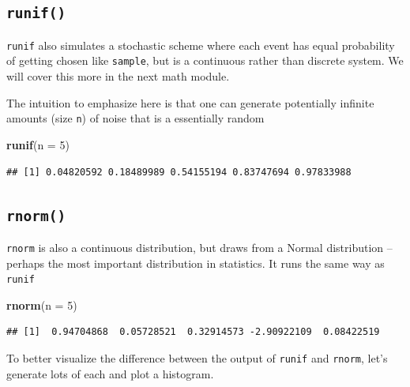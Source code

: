 \documentclass[]{book}
\newenvironment{Shaded}{\begin{snugshade}}{\end{snugshade}}
\newcommand{\DataTypeTok}[1]{\textcolor[rgb]{0.13,0.29,0.53}{#1}}
\newcommand{\DecValTok}[1]{\textcolor[rgb]{0.00,0.00,0.81}{#1}}
\newcommand{\KeywordTok}[1]{\textcolor[rgb]{0.13,0.29,0.53}{\textbf{#1}}}
\newcommand{\NormalTok}[1]{#1}
\theoremstyle{definition}
\theoremstyle{definition}
\theoremstyle{definition}
\theoremstyle{remark}
\begin{document}
\hypertarget{runif}{%
\subsection*{\texorpdfstring{\texttt{runif()}}{runif()}}\label{runif}}

\texttt{runif} also simulates a stochastic scheme where each event has equal probability of getting chosen like \texttt{sample}, but is a continuous rather than discrete system. We will cover this more in the next math module.

The intuition to emphasize here is that one can generate potentially infinite amounts (size \texttt{n}) of noise that is a essentially random

\begin{Shaded}
\begin{Highlighting}[]
\KeywordTok{runif}\NormalTok{(}\DataTypeTok{n =} \DecValTok{5}\NormalTok{)}
\end{Highlighting}
\end{Shaded}

\begin{verbatim}
## [1] 0.04820592 0.18489989 0.54155194 0.83747694 0.97833988
\end{verbatim}

\hypertarget{rnorm}{%
\subsection*{\texorpdfstring{\texttt{rnorm()}}{rnorm()}}\label{rnorm}}

\texttt{rnorm} is also a continuous distribution, but draws from a Normal distribution -- perhaps the most important distribution in statistics. It runs the same way as \texttt{runif}

\begin{Shaded}
\begin{Highlighting}[]
\KeywordTok{rnorm}\NormalTok{(}\DataTypeTok{n =} \DecValTok{5}\NormalTok{)}
\end{Highlighting}
\end{Shaded}

\begin{verbatim}
## [1]  0.94704868  0.05728521  0.32914573 -2.90922109  0.08422519
\end{verbatim}

To better visualize the difference between the output of \texttt{runif} and \texttt{rnorm}, let's generate lots of each and plot a histogram.
\end{document}
